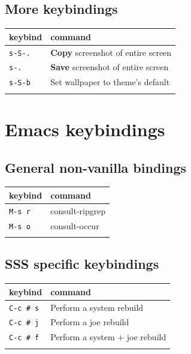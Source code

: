 \documentclass[11pt]{article}
\begin{document}
\subsection{More keybindings}
\label{sec:org73f6318}

\begin{center}
\begin{tabular}{ll}
keybind & command\\[0pt]
\hline
\texttt{s-S-.} & \textbf{Copy} screenshot of entire screen\\[0pt]
\texttt{s-.} & \textbf{Save} screenshot of entire screen\\[0pt]
\texttt{s-S-b} & Set wallpaper to theme's default\\[0pt]
 & \\[0pt]
\hline
\end{tabular}
\end{center}
\section{Emacs keybindings}
\label{sec:orgbf601e1}

\subsection{General non-vanilla bindings}
\label{sec:org7c1ca3d}

\begin{center}
\begin{tabular}{ll}
keybind & command\\[0pt]
\hline
\texttt{M-s r} & consult-ripgrep\\[0pt]
\texttt{M-s o} & consult-occur\\[0pt]
 & \\[0pt]
\hline
\end{tabular}
\end{center}

\subsection{SSS specific keybindings}
\label{sec:orgefa8c6e}

\begin{center}
\begin{tabular}{ll}
keybind & command\\[0pt]
\hline
\texttt{C-c \# s} & Perform a system rebuild\\[0pt]
\texttt{C-c \# j} & Perform a joe rebuild\\[0pt]
\texttt{C-c \# f} & Perform a system + joe rebuild\\[0pt]
 & \\[0pt]
\hline
\end{tabular}
\end{center}
\end{document}
